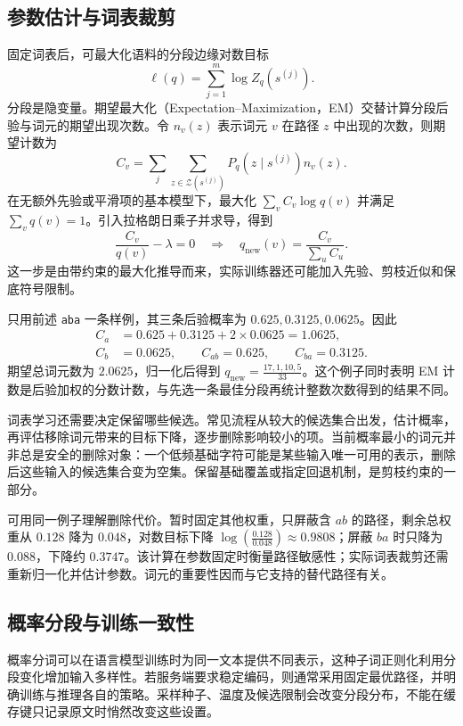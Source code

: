 \documentclass[../textbook.tex]{subfiles}
\begin{document}
\subsection{参数估计与词表裁剪}
固定词表后，可最大化语料的分段边缘对数目标
\begin{equation}
 \ell(q)=\sum_{j=1}^{m}\log Z_q(s^{(j)}).
\end{equation}
分段是隐变量。期望最大化（Expectation--Maximization，EM）交替计算分段后验与词元的期望出现次数。令 $n_v(z)$ 表示词元 $v$ 在路径 $z$ 中出现的次数，则期望计数为
\begin{equation}
 C_v=\sum_j\sum_{z\in\mathcal Z(s^{(j)})}
 P_q(z\mid s^{(j)})n_v(z).
\end{equation}
在无额外先验或平滑项的基本模型下，最大化 $\sum_v C_v\log q(v)$ 并满足 $\sum_vq(v)=1$。引入拉格朗日乘子并求导，得到
\begin{equation}
 \frac{C_v}{q(v)}-\lambda=0
 \quad\Longrightarrow\quad
 q_{\mathrm{new}}(v)=\frac{C_v}{\sum_u C_u}.
\end{equation}
这一步是由带约束的最大化推导而来，实际训练器还可能加入先验、剪枝近似和保底符号限制。

只用前述 \texttt{aba} 一条样例，其三条后验概率为 $0.625,0.3125,0.0625$。因此
\begin{align}
 C_a&=0.625+0.3125+2\times0.0625=1.0625,\\
 C_b&=0.0625,\qquad C_{ab}=0.625,\qquad C_{ba}=0.3125.
\end{align}
期望总词元数为 $2.0625$，归一化后得到 $q_{\mathrm{new}}=\frac{17,1,10,5}{33}$。这个例子同时表明 EM 计数是后验加权的分数计数，与先选一条最佳分段再统计整数次数得到的结果不同。

词表学习还需要决定保留哪些候选。常见流程从较大的候选集合出发，估计概率，再评估移除词元带来的目标下降，逐步删除影响较小的项\cite{kudoSubwordRegularization2018}。当前概率最小的词元并非总是安全的删除对象：一个低频基础字符可能是某些输入唯一可用的表示，删除后这些输入的候选集合变为空集。保留基础覆盖或指定回退机制，是剪枝约束的一部分。

可用同一例子理解删除代价。暂时固定其他权重，只屏蔽含 $ab$ 的路径，剩余总权重从 $0.128$ 降为 $0.048$，对数目标下降 $\log(\frac{0.128}{0.048})\approx0.9808$；屏蔽 $ba$ 时只降为 $0.088$，下降约 $0.3747$。该计算在参数固定时衡量路径敏感性；实际词表裁剪还需重新归一化并估计参数。词元的重要性因而与它支持的替代路径有关。

\subsection{概率分段与训练一致性}
概率分词可以在语言模型训练时为同一文本提供不同表示，这种子词正则化利用分段变化增加输入多样性。若服务端要求稳定编码，则通常采用固定最优路径，并明确训练与推理各自的策略。采样种子、温度及候选限制会改变分段分布，不能在缓存键只记录原文时悄然改变这些设置。
\end{document}
